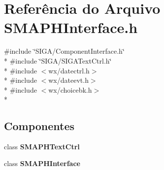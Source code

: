 \section{Referência do Arquivo S\+M\+A\+P\+H\+Interface.\+h}
\label{_s_m_a_p_h_interface_8h}
{\ttfamily \#include \char`\"{}S\+I\+G\+A/\+Component\+Interface.\+h\char`\"{}}\\*
{\ttfamily \#include \char`\"{}S\+I\+G\+A/\+S\+I\+G\+A\+Text\+Ctrl.\+h\char`\"{}}\\*
{\ttfamily \#include $<$wx/datectrl.\+h$>$}\\*
{\ttfamily \#include $<$wx/dateevt.\+h$>$}\\*
{\ttfamily \#include $<$wx/choicebk.\+h$>$}\\*
\subsection*{Componentes}
\begin{DoxyCompactItemize}
\item 
class {\bf S\+M\+A\+P\+H\+Text\+Ctrl}
\item 
class {\bf S\+M\+A\+P\+H\+Interface}
\end{DoxyCompactItemize}
